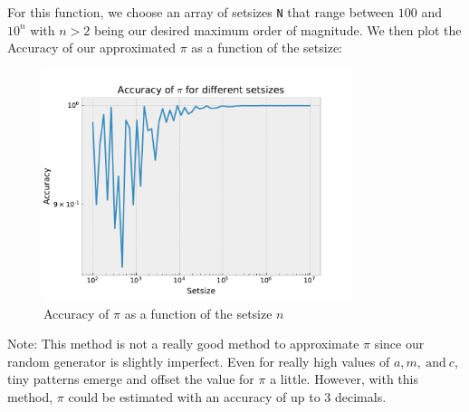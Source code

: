 \documentclass{article}
\begin{document}
For this function, we choose an array of setsizes \texttt{N} that range between
\( 100 \) and \( 10^n \) with \( n > 2 \) being our desired maximum order of
magnitude. We then plot the Accuracy of our approximated \( \pi \) as a
function of the setsize:
\begin{figure}[H]
    \centering
    \includegraphics[width=9cm]{Fig3-2.pdf}
    \caption{Accuracy of $\pi$ as a function of the setsize $n$}
\end{figure}
Note: This method is not a really good method to approximate \( \pi \) since
our random generator is slightly imperfect. Even for really high values of
\( a, m, \ \text{and} \ c \), tiny patterns emerge and offset the value for
\( \pi \) a little. However, with this method, \( \pi \) could be estimated
with an accuracy of up to 3 decimals.
\end{document}
